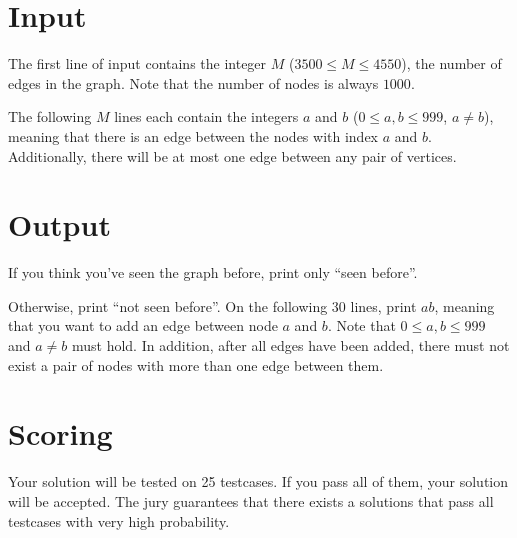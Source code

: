\section*{Input}
The first line of input contains the integer $M$ ($3500 \leq M \leq 4550$), the number of edges in the graph. Note that
the number of nodes is always $1000$.

The following $M$ lines each contain the integers $a$ and $b$ ($0 \leq a,b \leq 999$, $a \neq b$), meaning that there is an edge
between the nodes with index $a$ and $b$. Additionally, there will be at most one edge between any pair of vertices.

\section*{Output}
If you think you've seen the graph before, print only ``seen before''.

Otherwise, print ``not seen before''. On the following $30$ lines, print $a b$, meaning that you want to add
an edge between node $a$ and $b$. Note that $0 \leq a,b \leq 999$ and $a \neq b$ must hold. In addition, after
all edges have been added, there must not exist a pair of nodes with more than one edge between them.

\section*{Scoring}
Your solution will be tested on 25 testcases. If you pass all of them, your solution will be accepted.
The jury guarantees that there exists a solutions that pass all testcases with very high probability.
